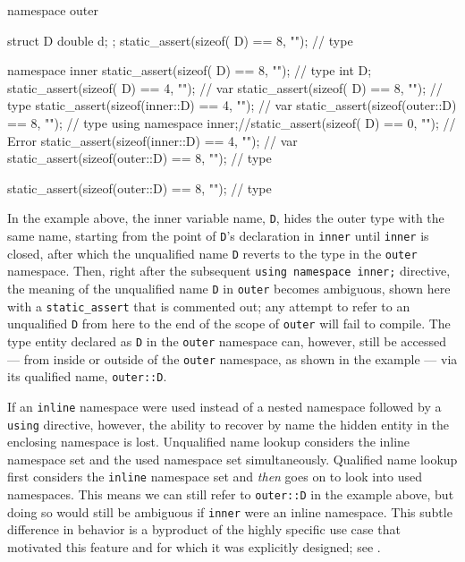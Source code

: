 \begin{emcppslisting}
namespace outer
{
    struct D { double d; }; static_assert(sizeof(       D) == 8, ""); // type

    namespace inner
    {                       static_assert(sizeof(       D) == 8, ""); // type
        int D;              static_assert(sizeof(       D) == 4, ""); // var
    }                       static_assert(sizeof(       D) == 8, ""); // type
                            static_assert(sizeof(inner::D) == 4, ""); // var
                            static_assert(sizeof(outer::D) == 8, ""); // type
    using namespace inner;//static_assert(sizeof(       D) == 0, ""); // Error
                            static_assert(sizeof(inner::D) == 4, ""); // var
                            static_assert(sizeof(outer::D) == 8, ""); // type
}                           static_assert(sizeof(outer::D) == 8, ""); // type
\end{emcppslisting}

\noindent In the example above, the inner variable name, \lstinline!D!, hides the
outer type with the same name, starting from the point of \lstinline!D!'s
declaration in \lstinline!inner! until \lstinline!inner! is closed, after
which the unqualified name \lstinline!D! reverts to the type in the
\lstinline!outer! namespace. Then, right after the subsequent
\lstinline!using!~\lstinline!namespace!~\lstinline!inner;! directive, the meaning
of the unqualified name \lstinline!D! in \lstinline!outer! becomes ambiguous,
shown here with a \lstinline!static_assert! that is commented out; any
attempt to refer to an unqualified \lstinline!D! from here to the end of
the scope of \lstinline!outer! will fail to compile. The type entity
declared as \lstinline!D! in the \lstinline!outer! namespace can, however,
still be accessed --- from inside or outside of the \lstinline!outer!
namespace, as shown in the example --- via its qualified name,
\lstinline!outer::D!.

If an \lstinline!inline! namespace were used instead of a nested namespace
followed by a \mbox{\lstinline!using!} directive, however, the ability to recover
by name the hidden entity in the enclosing namespace is lost.
Unqualified name lookup considers the inline namespace set and the used
namespace set simultaneously. Qualified name lookup first considers the
\lstinline!inline! namespace set and \emph{then} goes on to look into used
namespaces. This means we can still refer to \lstinline!outer::D! in the
example above, but doing so would still be ambiguous if \lstinline!inner!
were an inline namespace. This subtle difference in behavior is a
byproduct of the highly specific use case that motivated this feature
and for which it was explicitly designed; see .

